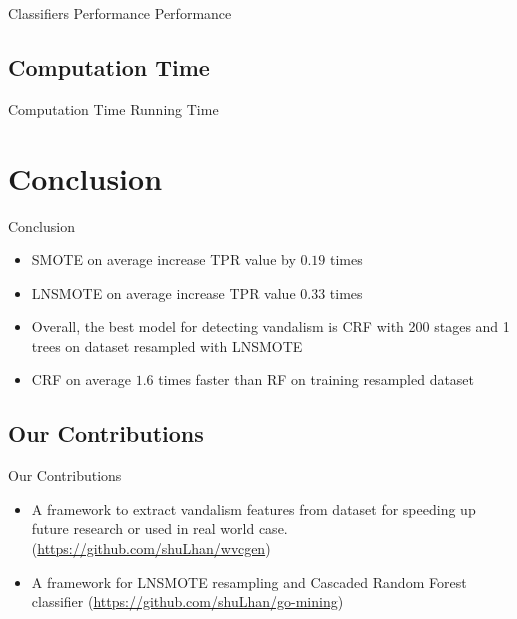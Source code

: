 \documentclass{beamer}
\begin{document}
\begin{frame}
	{Classifiers Performance}
	{Performance}
	
\end{frame}

\subsection{Computation Time}

\begin{frame}
	{Computation Time}
	{Running Time}
	
\end{frame}


\section{Conclusion}

\begin{frame}
	\begin{multicols}{2}
		\tableofcontents[currentsection]
	\end{multicols}
\end{frame}

\begin{frame}
	{Conclusion}
	\begin{itemize}
		\item SMOTE on average increase TPR value by $0.19$ times
		\item LNSMOTE on average increase TPR value $0.33$ times
		\item Overall, the best model for detecting vandalism is CRF with 200
		stages and 1 trees on dataset resampled with LNSMOTE
		\item CRF on average $1.6$ times faster than RF on training resampled
		dataset
	\end{itemize}
\end{frame}

\subsection{Our Contributions}
\begin{frame}
	{Our Contributions}
	\begin{itemize}
		\item A framework to extract vandalism features from dataset for
		speeding up future research or used in real world case.
		(\url{https://github.com/shuLhan/wvcgen})
		\item A framework for LNSMOTE resampling and Cascaded Random Forest
		classifier
		(\url{https://github.com/shuLhan/go-mining})
	\end{itemize}
\end{frame}
\end{document}
